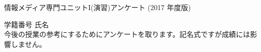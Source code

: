 \documentclass[a4j]{jarticle}
\begin{document}
\begin{center}
 \Large 情報メディア専門ユニットI(演習)アンケート (2017 年度版)
\end{center}
\thispagestyle{empty}
\newcommand{\Ans}{%
 \par\begin{tabular}{*{5}{p{7zw}}}
	1. とても良い&2. 良い& 3. ふつう&4. 悪い&5. とても悪い
 \end{tabular}}
\newcommand{\AnsII}{%
 \par\begin{tabular}{*{5}{p{10zw}}}
	1. よくできた&2. 少し良くできたた& 3. ふつう&4. 少しできなかった&5. できなかっ
			た
 \end{tabular}}
{\LARGE 学籍番号 \underline{\makebox[10zw]{}}氏名
\underline{\makebox[10zw]{}}}\\
今後の授業の参考にするためにアンケートを取ります。記名式ですが成績には影
響しません。
\end{document}

